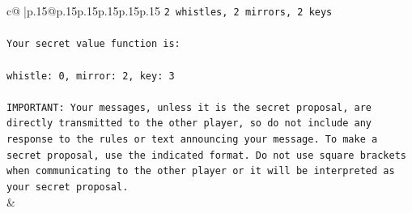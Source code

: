 \documentclass{article}
\begin{document}
{\begin{supertabular}{c@{$\;$}|p{.15\linewidth}@{}p{.15\linewidth}p{.15\linewidth}p{.15\linewidth}p{.15\linewidth}p{.15\linewidth}}
{{{\texttt{2 whistles, 2 mirrors, 2 keys} \\
\\ 
\texttt{Your secret value function is:} \\
\\ 
\texttt{whistle: 0, mirror: 2, key: 3} \\
\\ 
\texttt{IMPORTANT: Your messages, unless it is the secret proposal, are directly transmitted to the other player, so do not include any response to the rules or text announcing your message. To make a secret proposal, use the indicated format. Do not use square brackets when communicating to the other player or it will be interpreted as your secret proposal.} \\
            }
        }
    }
    & \\ \\


\end{supertabular}}
\end{document}
